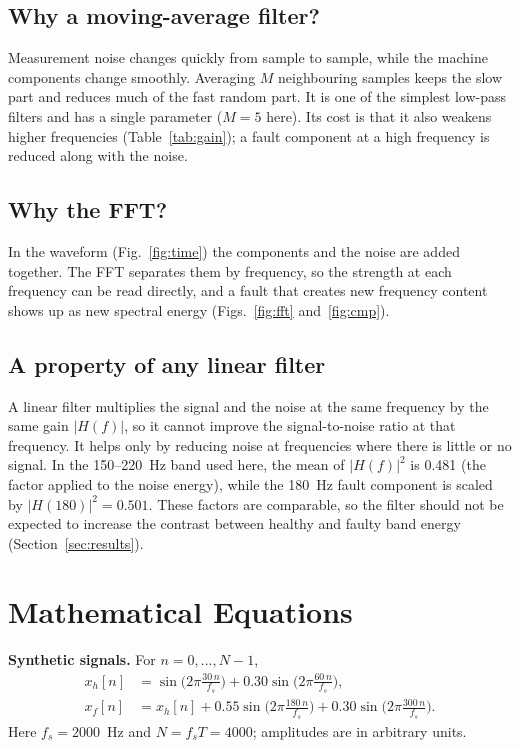 \documentclass[10pt,twocolumn,a4paper]{article}
\begin{document}
\subsection{Why a moving-average filter?}
Measurement noise changes quickly from sample to sample, while the machine components change smoothly. Averaging $M$ neighbouring
samples keeps the slow part and reduces much of the fast random part. It is one of the simplest low-pass filters and has a single parameter
($M=5$ here). Its cost is that it also weakens higher frequencies (Table~\ref{tab:gain}); a fault component at a high frequency is
reduced along with the noise.

\subsection{Why the FFT?}
In the waveform (Fig.~\ref{fig:time}) the components and the noise are added together. The FFT separates them by frequency, so the
strength at each frequency can be read directly, and a fault that creates new frequency content shows up as new spectral energy
(Figs.~\ref{fig:fft} and~\ref{fig:cmp}).

\subsection{A property of any linear filter}\label{sec:linear}
A linear filter multiplies the signal and the noise at the same frequency by the same gain $|H(f)|$, so it cannot improve the
signal-to-noise ratio at that frequency. It helps only by reducing noise at frequencies where there is little or no signal.
In the 150--220~Hz band used here, the mean of $|H(f)|^{2}$ is 0.481 (the factor applied to the noise energy), while the
180~Hz fault component is scaled by $|H(180)|^{2}=0.501$. These factors are comparable, so the filter should not
be expected to increase the contrast between healthy and faulty band energy (Section~\ref{sec:results}).

\section{Mathematical Equations}
\textbf{Synthetic signals.} For $n=0,\dots,N-1$,
\begin{align}
x_h[n] &= \sin\!\Big(2\pi\tfrac{30\,n}{f_s}\Big)+0.30\sin\!\Big(2\pi\tfrac{60\,n}{f_s}\Big),\nonumber\\
x_f[n] &= x_h[n]+0.55\sin\!\Big(2\pi\tfrac{180\,n}{f_s}\Big)+0.30\sin\!\Big(2\pi\tfrac{300\,n}{f_s}\Big).\label{eq:sig}
\end{align}
Here $f_s=2000$~Hz and $N=f_sT=4000$; amplitudes are in arbitrary units.
\end{document}
